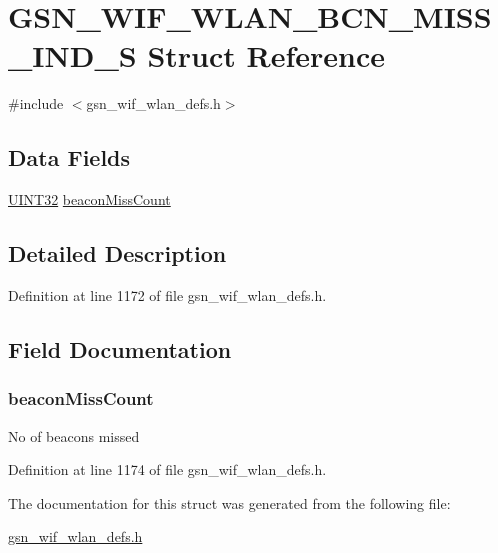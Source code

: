 \hypertarget{a00371}{
\section{GSN\_\-WIF\_\-WLAN\_\-BCN\_\-MISS\_\-IND\_\-S Struct Reference}
\label{a00371}
}


{\ttfamily \#include $<$gsn\_\-wif\_\-wlan\_\-defs.h$>$}

\subsection*{Data Fields}
\begin{DoxyCompactItemize}
\item 
\hyperlink{a00660_gae1e6edbbc26d6fbc71a90190d0266018}{UINT32} \hyperlink{a00371_a21739c1d4e7504d94163a0c6bc7361c2}{beaconMissCount}
\end{DoxyCompactItemize}


\subsection{Detailed Description}


Definition at line 1172 of file gsn\_\-wif\_\-wlan\_\-defs.h.



\subsection{Field Documentation}
\hypertarget{a00371_a21739c1d4e7504d94163a0c6bc7361c2}{
\subsubsection[{beaconMissCount}]{ {\bf beaconMissCount}}}
\label{a00371_a21739c1d4e7504d94163a0c6bc7361c2}
No of beacons missed 

Definition at line 1174 of file gsn\_\-wif\_\-wlan\_\-defs.h.



The documentation for this struct was generated from the following file:\begin{DoxyCompactItemize}
\item 
\hyperlink{a00613}{gsn\_\-wif\_\-wlan\_\-defs.h}\end{DoxyCompactItemize}
